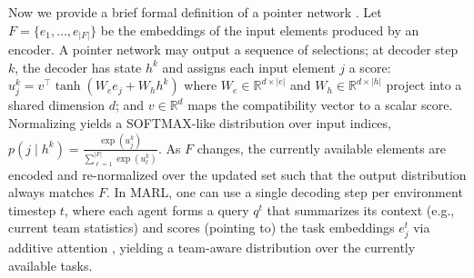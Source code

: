 Now we provide a brief formal definition of a pointer network \cite{ptr}. Let $F=\{e_1,\dots,e_{|F|}\}$ be the embeddings of the input elements produced by an encoder. A pointer network may output a sequence of selections; at decoder step $k$, the decoder has state $h^{k}$ and assigns each input element $j$ a score: ${u^{k}_{j}} = v^\top \tanh(W_e e_j + W_h h^{k})$  where  $W_e \in \mathbb{R}^{d \times |e|}$ and $W_h \in \mathbb{R}^{d \times |h|}$ project into a shared dimension $d$; and $v \in \mathbb{R}^{d}$ maps the compatibility vector to a scalar score. Normalizing yields a SOFTMAX-like distribution over input indices, $p(j \mid h^{k}) = \frac{\exp(u^{k}_{j})}{\sum_{\ell=1}^{|F|} \exp(u^{k}_{\ell})}$.  As $F$ changes, the currently available elements are encoded and  re-normalized over the updated set such that the output distribution always matches $F$. In MARL, one can use a single decoding step per environment timestep $t$, where each agent forms a query $q^t$ that summarizes its context (e.g., current team statistics) and scores (pointing to) the task embeddings ${e_j^t}$ via additive attention \cite{bahdanau2014neural}, yielding a team-aware distribution over the currently available tasks.




\noindent 






